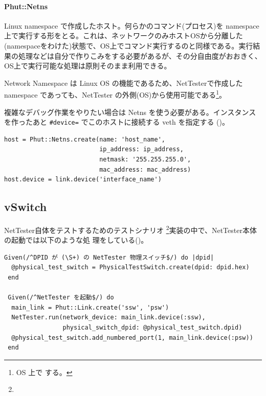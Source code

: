 \paragraph{Phut::Netns}
Linux namespace で作成したホスト。何らかのコマンド(プロセス)を namespace
上で実行する形をとる。これは、ネットワークのみホストOSから分離した
(namespaceをわけた)状態で、OS上でコマンド実行するのと同様である。実行結
果の処理などは自分で作りこみをする必要があるが、その分自由度がおおきく、
OS上で実行可能な処理は原則そのまま利用できる。

Network Namespace は Linux OS の機能であるため、NetTesterで作成した
namespace であっても、NetTester の外側(OS)から使用可能である\footnote{OS
上で  する。}。

複雑なデバッグ作業をやりたい場合は Netns を使う必要がある。インスタンス
を作ったあと \verb|#device=| でこのホストに接続する veth を指定する
()。

\begin{lstlisting}[caption=Phut::Netnsインスタンスの作成,label=lst:create-netns-instance]
host = Phut::Netns.create(name: 'host_name',
                          ip_address: ip_address,
                          netmask: '255.255.255.0',
                          mac_address: mac_address)
host.device = link.device('interface_name')
\end{lstlisting}

\subsection{vSwitch}

NetTester自体をテストするためのテストシナリオ
\footnote{}実装の中で、NetTester本体の起動では以下のような処
理をしている()。
\begin{lstlisting}[caption=NetTesterの起動,label=lst:run-nettester]
 Given(/^DPID が (\S+) の NetTester 物理スイッチ$/) do |dpid|
  @physical_test_switch = PhysicalTestSwitch.create(dpid: dpid.hex)
 end

 Given(/^NetTester を起動$/) do
  main_link = Phut::Link.create('ssw', 'psw')
  NetTester.run(network_device: main_link.device(:ssw),
                physical_switch_dpid: @physical_test_switch.dpid)
  @physical_test_switch.add_numbered_port(1, main_link.device(:psw))
 end
\end{lstlisting}

